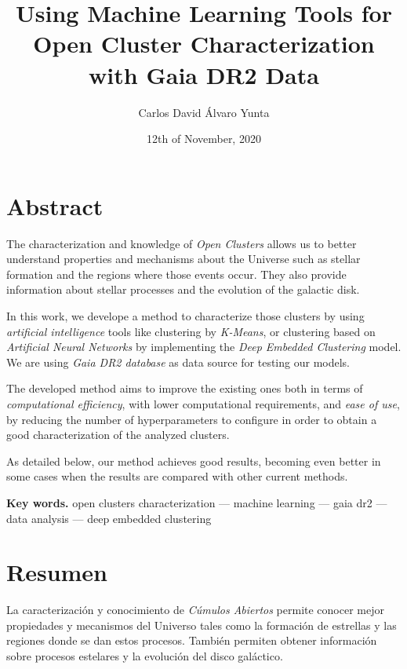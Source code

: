\documentclass[11pt, a4paper, english]{book}
\title{Using Machine Learning Tools for Open Cluster Characterization with Gaia DR2 Data}
\author{Carlos David Álvaro Yunta}
\date{12th of November, 2020}
\begin{document}

\maketitle

\frontmatter
\tableofcontents

\chapter{Abstract}

The characterization and knowledge of \emph{Open Clusters} allows us to better understand properties and mechanisms about the Universe
such as stellar formation and the regions where those events occur. They also provide information about stellar processes and the
evolution of the galactic disk.

In this work, we develope a method to characterize those clusters by using \emph{artificial intelligence} tools like clustering
by \emph{K-Means}, or clustering based on \emph{Artificial Neural Networks} by implementing the \emph{Deep Embedded Clustering}
model. We are using \emph{Gaia DR2 database} as data source for testing our models.

The developed method aims to improve the existing ones both in terms of \emph{computational efficiency}, with lower computational requirements,
and \emph{ease of use}, by reducing the number of hyperparameters to configure in order to obtain a good characterization of the analyzed clusters.

As detailed below, our method achieves good results, becoming even better in some cases when the results are compared with other current methods.

\medskip

{\bf Key words.} open clusters characterization --- machine learning --- gaia dr2 --- data analysis --- deep embedded clustering

\chapter{Resumen}

La caracterización y conocimiento de \emph{Cúmulos Abiertos} permite conocer mejor propiedades y mecanismos del Universo tales como
la formación de estrellas y las regiones donde se dan estos procesos. También permiten obtener información sobre procesos estelares
y la evolución del disco galáctico.
\end{document}
